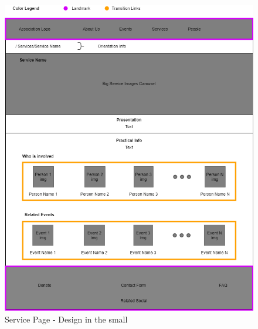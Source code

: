 \begin{figure}[h!]
		\centering
		\begin{minipage}[b]{1\textwidth}
    			\includegraphics[width=\textwidth]{./assets/servicedetails.png}
			\caption{Service Page - Design in the small}
		\end{minipage}
\end{figure}
\FloatBarrier
